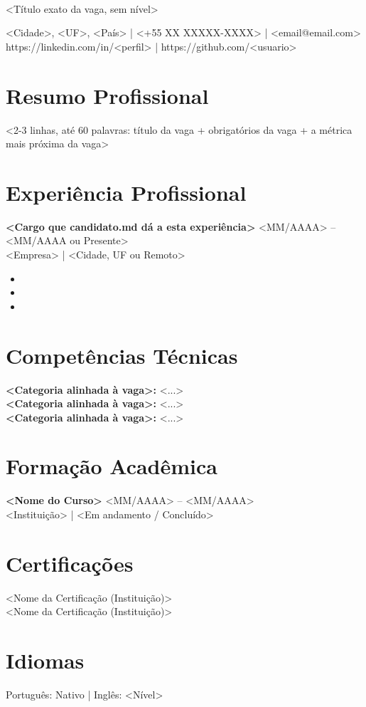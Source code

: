 \documentclass[10pt,a4paper]{article}
\begin{document}
\textbf{} \\
<Título exato da vaga, sem nível>

<Cidade>, <UF>, <País> | <+55 XX XXXXX-XXXX> | <email@email.com> \\
https://linkedin.com/in/<perfil> | https://github.com/<usuario>

\section*{Resumo Profissional}

<2-3 linhas, até 60 palavras: título da vaga + obrigatórios da vaga + a
métrica mais próxima da vaga>

\section*{Experiência Profissional}

\textbf{<Cargo que candidato.md dá a esta experiência>} \hfill <MM/AAAA> -- <MM/AAAA ou Presente> \\
<Empresa> | <Cidade, UF ou Remoto>

\begin{itemize}
\item <Bullet mais alinhado à vaga, com métrica quando existir na base>
\item <Bullet CAR com keyword obrigatória da vaga em contexto real>
\item <Bullet CAR com keyword obrigatória da vaga em contexto real>
\end{itemize}


\section*{Competências Técnicas}

\textbf{<Categoria alinhada à vaga>:} <...> \\
\textbf{<Categoria alinhada à vaga>:} <...> \\
\textbf{<Categoria alinhada à vaga>:} <...>

\section*{Formação Acadêmica}

\textbf{<Nome do Curso>} \hfill <MM/AAAA> -- <MM/AAAA> \\
<Instituição> | <Em andamento / Concluído>

\section*{Certificações}

<Nome da Certificação (Instituição)> \\
<Nome da Certificação (Instituição)>

\section*{Idiomas}

Português: Nativo | Inglês: <Nível>
\end{document}
